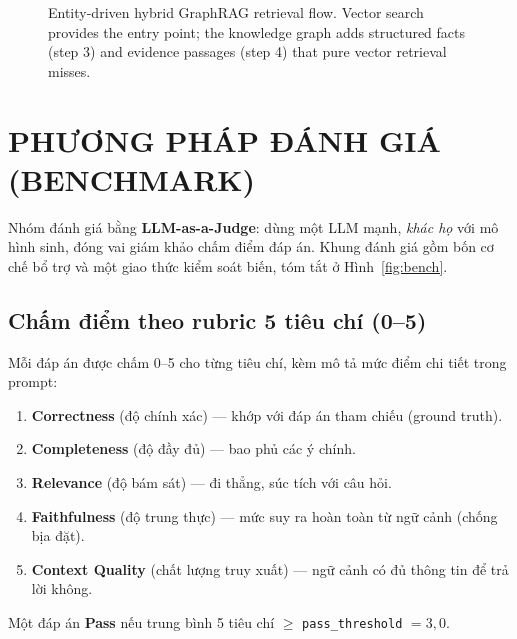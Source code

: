 \documentclass[conference]{IEEEtran}
\begin{document}
\begin{figure}[!t]
\centering
{}
\caption{Entity-driven hybrid GraphRAG retrieval flow. Vector search provides the entry point; the knowledge graph adds structured facts (step 3) and evidence passages (step 4) that pure vector retrieval misses.}
\label{fig:graphrag}
\end{figure}

\section{PHƯƠNG PHÁP ĐÁNH GIÁ (BENCHMARK)}\label{sec:eval}
Nhóm đánh giá bằng \textbf{LLM-as-a-Judge}: dùng một LLM mạnh, \emph{khác họ} với mô hình sinh, đóng vai giám khảo chấm điểm đáp án. Khung đánh giá gồm bốn cơ chế bổ trợ và một giao thức kiểm soát biến, tóm tắt ở Hình~\ref{fig:bench}.

\subsection{Chấm điểm theo rubric 5 tiêu chí (0--5)}
Mỗi đáp án được chấm 0--5 cho từng tiêu chí, kèm mô tả mức điểm chi tiết trong prompt:
\begin{enumerate}
    \item \textbf{Correctness} (độ chính xác) --- khớp với đáp án tham chiếu (ground truth).
    \item \textbf{Completeness} (độ đầy đủ) --- bao phủ các ý chính.
    \item \textbf{Relevance} (độ bám sát) --- đi thẳng, súc tích với câu hỏi.
    \item \textbf{Faithfulness} (độ trung thực) --- mức suy ra hoàn toàn từ ngữ cảnh (chống bịa đặt).
    \item \textbf{Context Quality} (chất lượng truy xuất) --- ngữ cảnh có đủ thông tin để trả lời không.
\end{enumerate}
Một đáp án \textbf{Pass} nếu trung bình 5 tiêu chí $\geq$ \texttt{pass\_threshold} $=3{,}0$.
\end{document}
